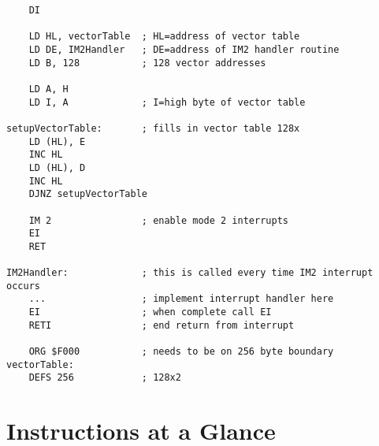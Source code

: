\documentclass[12pt,twoside,openright,a4paper]{book}
\begin{document}
\begin{lstlisting}
	DI
	
	LD HL, vectorTable  ; HL=address of vector table
	LD DE, IM2Handler   ; DE=address of IM2 handler routine
	LD B, 128           ; 128 vector addresses

	LD A, H
	LD I, A             ; I=high byte of vector table

setupVectorTable:       ; fills in vector table 128x
	LD (HL), E
	INC HL
	LD (HL), D
	INC HL
	DJNZ setupVectorTable 

	IM 2                ; enable mode 2 interrupts
	EI
	RET

IM2Handler:             ; this is called every time IM2 interrupt occurs
	...                 ; implement interrupt handler here
	EI                  ; when complete call EI
	RETI                ; end return from interrupt

	ORG $F000           ; needs to be on 256 byte boundary
vectorTable:
	DEFS 256            ; 128x2
\end{lstlisting}



\pagebreak
\chapter{Instructions at a Glance}

\end{document}
